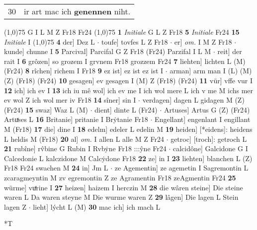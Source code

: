 \documentclass[8pt,a4paper,notitlepage]{article}
\begin{document}
\begin{table}[ht]
\begin{minipage}[t]{0.5\linewidth}
\begin{tabular}{rl}
30 & ir art mac ich \textbf{genennen} niht.\\ 
\end{tabular}
\scriptsize
\line(1,0){75} \newline
G I L M Z Fr18 Fr24 \newline
\line(1,0){75} \newline
\textbf{1} \textit{Initiale} G L Z Fr18  \textbf{5} \textit{Initiale} Fr24  \textbf{15} \textit{Initiale} I  \newline
\line(1,0){75} \newline
\textbf{4} der] Dez L  $\cdot$ toufe] tovfes L Z Fr18  $\cdot$ er] \textit{om.} I M Z Fr18  $\cdot$ kunde] chunne I \textbf{5} Parcival] Parcifal G Z Fr18 (Fr24) Parzifal I L M  $\cdot$ reit] der rait I \textbf{6} grôzen] so grozem I grvnem Fr18 grozzem Fr24 \textbf{7} liehten] lichten L (M) (Fr24) \textbf{8} rîchen] richem I Fr18 \textbf{9} ez ist] ez ist ez ist I  $\cdot$ arman] arm man I (L) (M) (Z) (Fr18) (Fr24) \textbf{10} gesagen] ev gesagen I (M) Z (Fr18) (Fr24) \textbf{11} vür] vffe vur I \textbf{12} ich] ich ev I \textbf{13} ich iu mê wol] ich ev me I ich wol mere L ich v me M ichs mer ev wol Z ich wol mer iv Fr18 \textbf{14} sîner] sin I  $\cdot$ verdagen] dagen L gidagen M (Z) (Fr24) \textbf{15} swaz] Waz L (M)  $\cdot$ dient] dinte L (Fr24)  $\cdot$ Artuses] Artus G (Z) (Fr24) Artuͯses L \textbf{16} Britanie] pritanie I Brẏtanie Fr18  $\cdot$ Engellant] engenlant I engillant M (Fr18) \textbf{17} die] dine I \textbf{18} edelm] edeler L edelin M \textbf{19} heiden] [*eidens]: heidens L heldis M (Fr18) \textbf{20} al] \textit{om.} I allen L alle M Z Fr24  $\cdot$ getroc] [troch]: getroch L \textbf{21} rubîne] rv̂bine G Rubin I Rvbẏne Fr18 :::ŷne Fr24  $\cdot$ calcidône] Galcidone G I Calcedonie L kalczidone M Calcẏdone Fr18 \textbf{22} ze] in I \textbf{23} liehten] blanchen L (Z) Fr18 Fr24 swachen M \textbf{24} in] Jm L  $\cdot$ ze Agementin] ze agemetin I Sagremontin L zcaragmeyntin M zv egremontin Z ze Agramentin Fr18 zeAgmentin Fr24 \textbf{25} würme] vuͤrine I \textbf{27} heizen] haizem I herczin M \textbf{28} die wâren steine] Die steine waren L Da waren steyne M Die wurme waren Z \textbf{29} lâgen] Die lagen L Stein lagen Z  $\cdot$ lieht] lýcht L (M) \textbf{30} mac ich] ich mach L \newline
\end{minipage}
\hspace{0.5cm}
\begin{minipage}[t]{0.5\linewidth}
\small
\begin{center}*T
\end{center}

\end{minipage}
\end{table}
\end{document}
